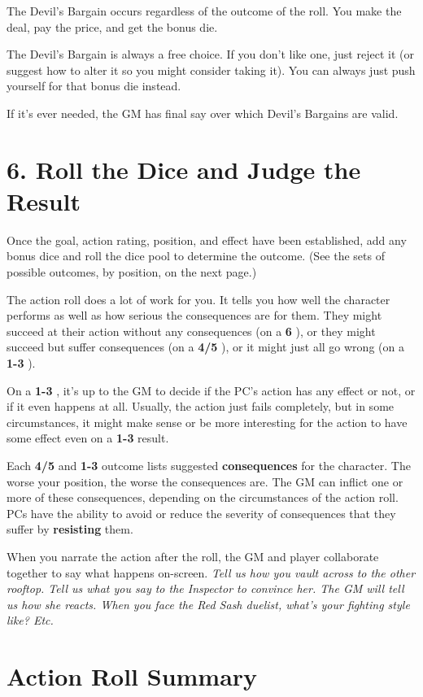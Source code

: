 \documentclass[11pt,fleqn,a5paper]{book}
\newcommand{\gameterm}[1]{\textbf{#1}}
\begin{document}
The Devil’s Bargain occurs regardless of the outcome of the roll. You make the deal, pay the price, and get the bonus die.

The Devil’s Bargain is always a free choice. If you don’t like one, just reject it (or suggest how to alter it so you might consider taking it). You can always just push yourself for that bonus die instead.

If it’s ever needed, the GM has final say over which Devil’s Bargains are valid.

\section{6. Roll the Dice and Judge the Result}

Once the goal, action rating, position, and effect have been established, add any bonus dice and roll the dice pool to determine the outcome. (See the sets of possible outcomes, by position, on the next page.)

The action roll does a lot of work for you. It tells you how well the character performs as well as how serious the consequences are for them. They might succeed at their action without any consequences (on a \gameterm{6} ), or they might succeed but suffer consequences (on a \gameterm{4/5} ), or it might just all go wrong (on a \gameterm{1-3} ).

On a \gameterm{1-3} , it’s up to the GM to decide if the PC’s action has any effect or not, or if it even happens at all. Usually, the action just fails completely, but in some circumstances, it might make sense or be more interesting for the action to have some effect even on a \gameterm{1-3}  result.

Each \gameterm{4/5}  and \gameterm{1-3}  outcome lists suggested \textbf{consequences} for the character. The worse your position, the worse the consequences are. The GM can inflict one or more of these consequences, depending on the circumstances of the action roll. PCs have the ability to avoid or reduce the severity of consequences that they suffer by \textbf{resisting} them.

When you narrate the action after the roll, the GM and player collaborate together to say what happens on-screen. \emph{Tell us how you vault across to the other rooftop. Tell us what you say to the Inspector to convince her. The GM will tell us how she reacts. When you face the Red Sash duelist, what’s your fighting style like? Etc.}

\section{Action Roll Summary}
\end{document}

